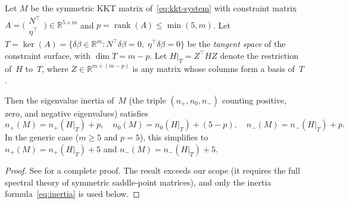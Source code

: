 
\begin{lemma}%
\label{lem:kkt-inertia}
Let $M$ be the symmetric KKT matrix
of~\eqref{eq:kkt-system} with
constraint matrix
$A = \bigl(\begin{smallmatrix} N^\top \\ \eta^\top
  \end{smallmatrix}\bigr) \in \mathbb{R}^{5 \times m}$
and $p = \operatorname{rank}(A) \leq \min(5, m)$.
Let $T = \ker(A) = \{\delta\beta \in \mathbb{R}^m :
  N^\top\delta\beta = 0,\; \eta^\top\delta\beta = 0\}$
be the \emph{tangent space} of the constraint surface,
with $\dim T = m - p$.
Let $H|_T = Z^\top H Z$ denote the restriction of~$H$
to~$T$, where $Z \in \mathbb{R}^{m \times (m-p)}$ is any
matrix whose columns form a basis of~$T$.

Then the eigenvalue inertia of~$M$
(the triple $(n_+, n_0, n_-)$ counting positive, zero,
and negative eigenvalues) satisfies
\begin{equation}\label{eq:inertia}
  n_+(M) = n_+(H|_T) + p, \quad
  n_0(M) = n_0(H|_T) + (5 - p), \quad
  n_-(M) = n_-(H|_T) + p.
\end{equation}
In the generic case ($m \geq 5$ and $p = 5$), this
simplifies to
$n_+(M) = n_+(H|_T) + 5$ and
$n_-(M) = n_-(H|_T) + 5$.
\end{lemma}

\begin{proof}
See \cite[Thm.~3.2]{BenziGolubLiesen2005} for a
complete proof.
The result exceeds our scope (it requires the full
spectral theory of symmetric saddle-point matrices),
and only the inertia
formula~\eqref{eq:inertia} is used below.
\end{proof}

